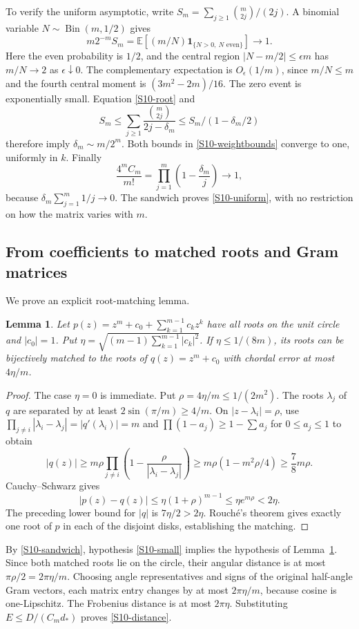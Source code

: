 \documentclass[11pt,a4paper]{article}
\newtheorem{lemma}[theorem]{Lemma}
\theoremstyle{definition}\newtheorem{definition}[theorem]{Definition}
\theoremstyle{remark}\newtheorem{remark}[theorem]{Remark}
\numberwithin{equation}{section}
\begin{document}
To verify the uniform asymptotic, write $S_m=\sum_{j\ge1}\binom m{2j}/(2j)$. A binomial variable $N\sim\operatorname{Bin}(m,1/2)$ gives
\[
 m2^{-m}S_m=\mathbb E[(m/N)\mathbf1_{\{N>0,\ N\text{ even}\}}]\longrightarrow1.
\]
Here the even probability is $1/2$, and the central region $|N-m/2|\le\epsilon m$ has $m/N\to2$ as $\epsilon\downarrow0$. The complementary expectation is $O_\epsilon(1/m)$, since $m/N\le m$ and the fourth central moment is $(3m^2-2m)/16$. The zero event is exponentially small. Equation \eqref{S10-root} and
\[
 S_m\le\sum_{j\ge1}\frac{\binom m{2j}}{2j-\delta_m}
 \le S_m/(1-\delta_m/2)
\]
therefore imply $\delta_m\sim m/2^m$. Both bounds in \eqref{S10-weightbounds} converge to one, uniformly in $k$. Finally
\[
 \frac{4^mC_m}{m!}=\prod_{j=1}^m\left(1-\frac{\delta_m}{j}\right)\longrightarrow1,
\]
because $\delta_m\sum_{j=1}^m1/j\to0$. The sandwich proves \eqref{S10-uniform}, with no restriction on how the matrix varies with $m$.

\subsection{From coefficients to matched roots and Gram matrices}\label{S10-sec-4}
We prove an explicit root-matching lemma.
\begin{lemma}\label{S10-roots}
Let $p(z)=z^m+c_0+\sum_{k=1}^{m-1}c_kz^k$ have all roots on the unit circle and $|c_0|=1$. Put $\eta=\sqrt{(m-1)\sum_{k=1}^{m-1}|c_k|^2}$. If $\eta\le1/(8m)$, its roots can be bijectively matched to the roots of $q(z)=z^m+c_0$ with chordal error at most $4\eta/m$.
\end{lemma}
\begin{proof}
The case $\eta=0$ is immediate. Put $\rho=4\eta/m\le1/(2m^2)$. The roots $\lambda_j$ of $q$ are separated by at least $2\sin(\pi/m)\ge4/m$. On $|z-\lambda_i|=\rho$, use $\prod_{j\ne i}|\lambda_i-\lambda_j|=|q'(\lambda_i)|=m$ and $\prod(1-a_j)\ge1-\sum a_j$ for $0\le a_j\le1$ to obtain
\[
 |q(z)|\ge m\rho\prod_{j\ne i}\left(1-\frac\rho{|\lambda_i-\lambda_j|}\right)
 \ge m\rho(1-m^2\rho/4)\ge\frac78m\rho.
\]
Cauchy--Schwarz gives
\[
 |p(z)-q(z)|\le\eta(1+\rho)^{m-1}\le\eta e^{m\rho}<2\eta.
\]
The preceding lower bound for $|q|$ is $7\eta/2>2\eta$. Rouch\'e's theorem gives exactly one root of $p$ in each of the disjoint disks, establishing the matching.
\end{proof}
By \eqref{S10-sandwich}, hypothesis \eqref{S10-small} implies the hypothesis of Lemma~\ref{S10-roots}. Since both matched roots lie on the circle, their angular distance is at most $\pi\rho/2=2\pi\eta/m$. Choosing angle representatives and signs of the original half-angle Gram vectors, each matrix entry changes by at most $2\pi\eta/m$, because cosine is one-Lipschitz. The Frobenius distance is at most $2\pi\eta$. Substituting $E\le D/(C_md_*)$ proves \eqref{S10-distance}.
\end{document}
